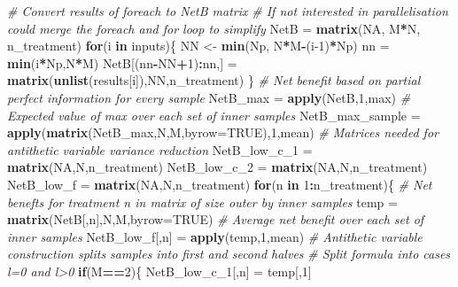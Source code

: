 \documentclass[
]{article}
\newenvironment{Shaded}{\begin{snugshade}}{\end{snugshade}}
\newcommand{\CommentTok}[1]{\textcolor[rgb]{0.56,0.35,0.01}{\textit{#1}}}
\newcommand{\ControlFlowTok}[1]{\textcolor[rgb]{0.13,0.29,0.53}{\textbf{#1}}}
\newcommand{\DataTypeTok}[1]{\textcolor[rgb]{0.13,0.29,0.53}{#1}}
\newcommand{\DecValTok}[1]{\textcolor[rgb]{0.00,0.00,0.81}{#1}}
\newcommand{\KeywordTok}[1]{\textcolor[rgb]{0.13,0.29,0.53}{\textbf{#1}}}
\newcommand{\NormalTok}[1]{#1}
\newcommand{\OperatorTok}[1]{\textcolor[rgb]{0.81,0.36,0.00}{\textbf{#1}}}
\newcommand{\OtherTok}[1]{\textcolor[rgb]{0.56,0.35,0.01}{#1}}
\newcommand{\StringTok}[1]{\textcolor[rgb]{0.31,0.60,0.02}{#1}}
\begin{document}
\begin{Shaded}
\begin{Highlighting}[]
{\CommentTok{# Convert results of foreach to NetB matrix}
  \CommentTok{# If not interested in parallelisation could merge the foreach and for loop to simplify}
\NormalTok{  NetB =}\StringTok{ }\KeywordTok{matrix}\NormalTok{(}\OtherTok{NA}\NormalTok{, M}\OperatorTok{*}\NormalTok{N, n_treatment)}
  \ControlFlowTok{for}\NormalTok{(i }\ControlFlowTok{in}\NormalTok{ inputs)\{}
\NormalTok{    NN <-}\StringTok{ }\KeywordTok{min}\NormalTok{(Np, N}\OperatorTok{*}\NormalTok{M}\OperatorTok{-}\NormalTok{(i}\DecValTok{-1}\NormalTok{)}\OperatorTok{*}\NormalTok{Np)}
\NormalTok{    nn =}\StringTok{ }\KeywordTok{min}\NormalTok{(i}\OperatorTok{*}\NormalTok{Np,N}\OperatorTok{*}\NormalTok{M)}
\NormalTok{    NetB[(nn}\OperatorTok{-}\NormalTok{NN}\OperatorTok{+}\DecValTok{1}\NormalTok{)}\OperatorTok{:}\NormalTok{nn,] =}\StringTok{ }\KeywordTok{matrix}\NormalTok{(}\KeywordTok{unlist}\NormalTok{(results[i]),NN,n_treatment)}
\NormalTok{  \}}
  \CommentTok{# Net benefit based on partial perfect information for every sample}
\NormalTok{  NetB_max =}\StringTok{ }\KeywordTok{apply}\NormalTok{(NetB,}\DecValTok{1}\NormalTok{,max)}
  \CommentTok{# Expected value of max over each set of inner samples}
\NormalTok{  NetB_max_sample =}\StringTok{ }\KeywordTok{apply}\NormalTok{(}\KeywordTok{matrix}\NormalTok{(NetB_max,N,M,}\DataTypeTok{byrow=}\OtherTok{TRUE}\NormalTok{),}\DecValTok{1}\NormalTok{,mean)}
  \CommentTok{# Matrices needed for antithetic variable variance reduction}
\NormalTok{  NetB_low_c_}\DecValTok{1}\NormalTok{ =}\StringTok{ }\KeywordTok{matrix}\NormalTok{(}\OtherTok{NA}\NormalTok{,N,n_treatment)}
\NormalTok{  NetB_low_c_}\DecValTok{2}\NormalTok{ =}\StringTok{ }\KeywordTok{matrix}\NormalTok{(}\OtherTok{NA}\NormalTok{,N,n_treatment)}
\NormalTok{  NetB_low_f =}\StringTok{ }\KeywordTok{matrix}\NormalTok{(}\OtherTok{NA}\NormalTok{,N,n_treatment)}
  \ControlFlowTok{for}\NormalTok{(n }\ControlFlowTok{in} \DecValTok{1}\OperatorTok{:}\NormalTok{n_treatment)\{}
    \CommentTok{# Net benefts for treatment n in matrix of size outer by inner samples}
\NormalTok{    temp =}\StringTok{ }\KeywordTok{matrix}\NormalTok{(NetB[,n],N,M,}\DataTypeTok{byrow=}\OtherTok{TRUE}\NormalTok{)}
    \CommentTok{# Average net benefit over each set of inner samples}
\NormalTok{    NetB_low_f[,n] =}\StringTok{ }\KeywordTok{apply}\NormalTok{(temp,}\DecValTok{1}\NormalTok{,mean)}
    \CommentTok{# Antithetic variable construction splits samples into first and second halves}
    \CommentTok{# Split formula into cases l=0 and l>0}
    \ControlFlowTok{if}\NormalTok{(M}\OperatorTok{==}\DecValTok{2}\NormalTok{)\{}
\NormalTok{      NetB_low_c_}\DecValTok{1}\NormalTok{[,n] =}\StringTok{ }\NormalTok{temp[,}\DecValTok{1}\NormalTok{]}
}
\end{Highlighting}
\end{Shaded}
\end{document}
